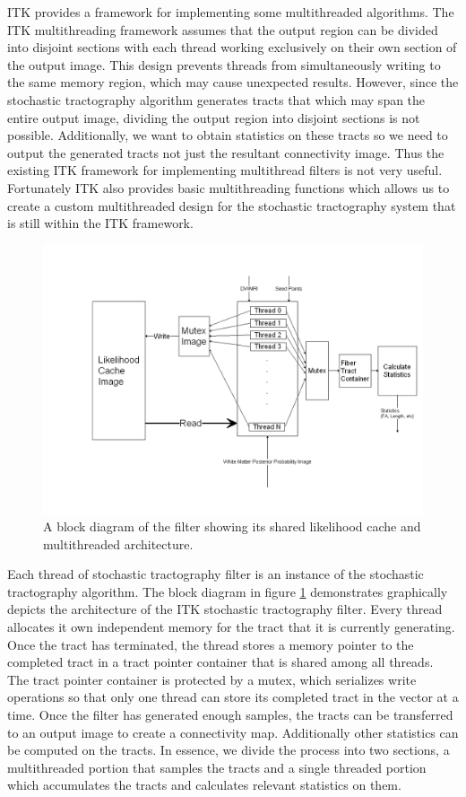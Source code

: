 ITK  provides a framework for implementing some multithreaded algorithms.  The ITK multithreading framework assumes that the output region can be divided into disjoint sections with each thread working exclusively on their own section of the output image.  This design prevents threads from simultaneously writing to the same memory region, which may cause unexpected results.  However, since the stochastic tractography algorithm generates tracts that which may span the entire output image, dividing the output region into disjoint sections is not possible.  Additionally, we want to obtain statistics on these tracts so we need to output the generated tracts not just the resultant connectivity image.  Thus the existing ITK framework for implementing multithread filters is not very useful.  Fortunately ITK also provides basic multithreading functions which allows us to create a custom multithreaded design for the stochastic tractography system that is still within the ITK framework. 
\begin{figure} \label{fig:filterblock}
  \center
	\includegraphics[width=\linewidth]{filterblock}
	\caption{A block diagram of the filter showing its shared likelihood cache and multithreaded architecture.}
\end{figure}
Each thread of stochastic tractography filter is an instance of the stochastic tractography algorithm. The block diagram in figure \ref{fig:filterblock} demonstrates graphically depicts the architecture of the ITK stochastic tractography filter.  Every thread allocates it own independent memory for the tract that it is currently generating.  Once the tract has terminated, the thread stores a memory pointer to the completed tract in a tract pointer container that is shared among all threads.  The tract pointer container is protected by a mutex, which serializes write operations so that only one thread can store its completed tract in the vector at a time.  Once the filter has generated enough samples, the tracts can be transferred to an output image to create a connectivity map.  Additionally other statistics can be computed on the tracts.  In essence, we divide the process into two sections, a multithreaded portion that samples the tracts and a single threaded portion which accumulates the tracts and calculates relevant statistics on them.

